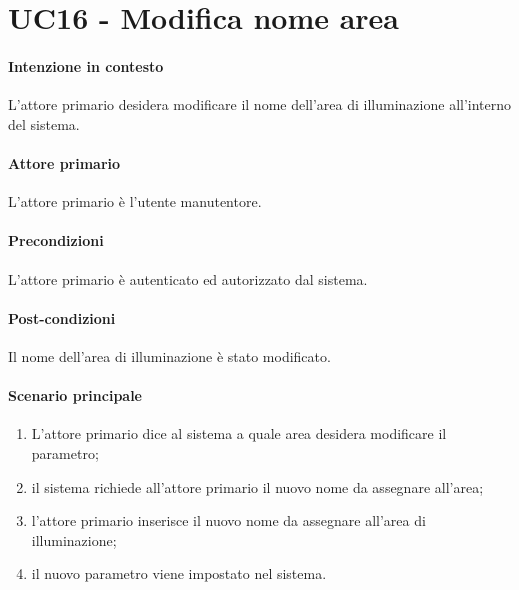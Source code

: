 \section{UC16 - Modifica nome area}\label{uc:16}
\paragraph{Intenzione in contesto} L'attore primario desidera modificare il nome dell'area di illuminazione all'interno del sistema.
\paragraph{Attore primario} L'attore primario è l'utente manutentore.
\paragraph{Precondizioni}  L'attore primario è autenticato ed autorizzato dal sistema.
\paragraph{Post-condizioni} Il nome dell'area di illuminazione è stato modificato.
\paragraph{Scenario principale}
\begin{enumerate}
    \item L'attore primario dice al sistema a quale area desidera modificare il parametro;
    \item il sistema richiede all'attore primario il nuovo nome da assegnare all'area;
    \item l'attore primario inserisce il nuovo nome da assegnare all'area di illuminazione;
    \item il nuovo parametro viene impostato nel sistema.
\end{enumerate}